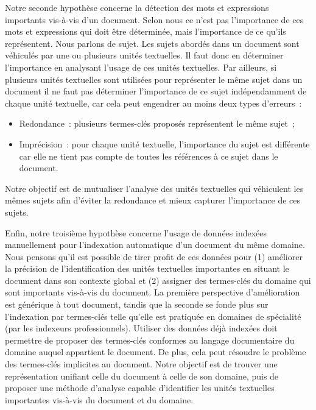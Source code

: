     Notre seconde hypothèse concerne la détection des mots et expressions
    importants vis-à-vis d'un document. Selon nous ce n'est pas l'importance de
    ces mots et expressions qui doit être déterminée, mais l'importance de ce
    qu'ils représentent. Nous parlons de sujet.
    Les sujets abordés dans un document sont véhiculés par une ou
    plusieurs unités textuelles. Il faut donc en déterminer l'importance en analysant
    l'usage de ces unités textuelles. Par ailleurs, si plusieurs unités
    textuelles sont utilisées pour représenter le même sujet dans un document il
    ne faut pas déterminer l'importance de ce sujet indépendamment de chaque
    unité textuelle, car cela peut engendrer au moins deux types d'erreurs~:
    \begin{itemize}
      \item{Redondance~: plusieurs termes-clés proposés représentent le
            même sujet~;}
      \item{Imprécision~: pour chaque unité textuelle, l'importance du sujet est
            différente car elle ne tient pas compte de toutes les références à ce
            sujet dans le document.}
    \end{itemize}
    Notre objectif est de mutualiser l'analyse des unités textuelles qui
    véhiculent les mêmes sujets afin d'éviter la redondance et mieux capturer
    l'importance de ces sujets.
    
    Enfin, notre troisième hypothèse concerne l'usage de données indexées
    manuellement pour l'indexation automatique d'un document du même domaine. Nous pensons qu'il est possible de tirer profit de ces données
    pour (1) améliorer la précision de l'identification des unités textuelles
    importantes en situant le document dans son contexte global et (2)
    assigner des termes-clés du domaine qui sont importants vis-à-vis du document.
    La première perspective d'amélioration est générique à tout document, tandis
    que la seconde se fonde plus sur l'indexation par termes-clés telle qu'elle
    est pratiquée en
    domaines de spécialité (par les indexeurs professionnels). Utiliser des
    données déjà indexées doit permettre de proposer des termes-clés conformes
    au langage documentaire du domaine auquel appartient le
    document. De plus, cela peut résoudre le problème des termes-clés implicites
    au document.
    Notre objectif est de trouver une représentation unifiant celle du
    document à celle de son domaine, puis de proposer une méthode d'analyse
    capable d'identifier les unités textuelles importantes vis-à-vis du document
    et du domaine.

